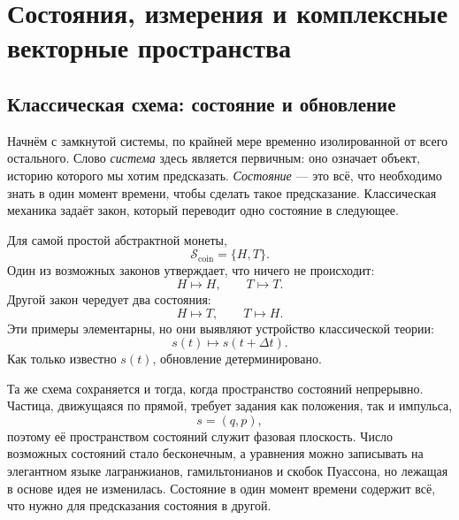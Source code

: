 \chapter{Состояния, измерения и комплексные векторные пространства}


\section{Классическая схема: состояние и обновление}

Начнём с замкнутой системы, по крайней мере временно изолированной от всего остального. Слово \emph{система} здесь является первичным: оно означает объект, историю которого мы хотим предсказать. \emph{Состояние} — это всё, что необходимо знать в один момент времени, чтобы сделать такое предсказание. Классическая механика задаёт закон, который переводит одно состояние в следующее.

Для самой простой абстрактной монеты,
\begin{equation}
  \mathcal S_{\mathrm{coin}}=\{H,T\}.
\end{equation}
Один из возможных законов утверждает, что ничего не происходит:
\begin{equation}
  H\longmapsto H,
  \qquad
  T\longmapsto T.
\end{equation}
Другой закон чередует два состояния:
\begin{equation}
  H\longmapsto T,
  \qquad
  T\longmapsto H.
\end{equation}
Эти примеры элементарны, но они выявляют устройство классической теории:
\begin{equation}
  s(t)\longmapsto s(t+\Delta t).
\end{equation}
Как только известно \(s(t)\), обновление детерминировано.

Та же схема сохраняется и тогда, когда пространство состояний непрерывно. Частица, движущаяся по прямой, требует задания как положения, так и импульса,
\begin{equation}
  s=(q,p),
\end{equation}
поэтому её пространством состояний служит фазовая плоскость. Число возможных состояний стало бесконечным, а уравнения можно записывать на элегантном языке лагранжианов, гамильтонианов и скобок Пуассона, но лежащая в основе идея не изменилась. Состояние в один момент времени содержит всё, что нужно для предсказания состояния в другой.

